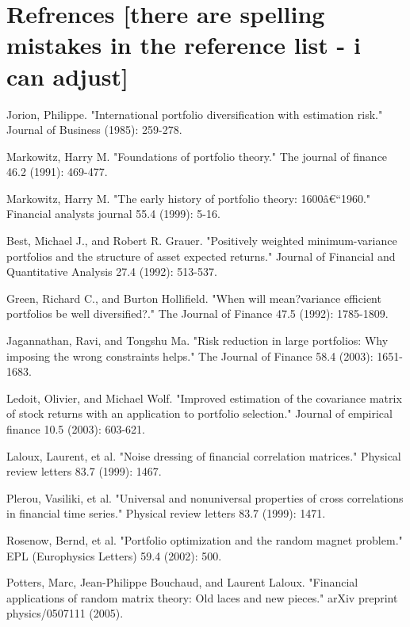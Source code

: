 \documentclass[ aip,jmp,reprint]{revtex4-2}
\begin{document}
\section{Refrences [there are spelling mistakes in the reference list - i
can adjust]}

\begin{thebibliography}{99}
 Jorion, Philippe. "International portfolio diversification
with estimation risk." Journal of Business (1985): 259-278.

 Markowitz, Harry M. "Foundations of portfolio theory." The
journal of finance 46.2 (1991): 469-477.

 Markowitz, Harry M. "The early history of portfolio theory:
1600\^{a}\euro ``1960." Financial analysts journal 55.4 (1999): 5-16.

 Best, Michael J., and Robert R. Grauer. "Positively weighted
minimum-variance portfolios and the structure of asset expected returns."
Journal of Financial and Quantitative Analysis 27.4 (1992): 513-537.

 Green, Richard C., and Burton Hollifield. "When will mean?variance efficient portfolios be well diversified?." The Journal of Finance 47.5 (1992): 1785-1809.

 Jagannathan, Ravi, and Tongshu Ma. "Risk reduction in
large portfolios: Why imposing the wrong constraints helps." The Journal of
Finance 58.4 (2003): 1651-1683.

 Ledoit, Olivier, and Michael Wolf. "Improved estimation of
the covariance matrix of stock returns with an application to portfolio
selection." Journal of empirical finance 10.5 (2003): 603-621.

 Laloux, Laurent, et al. "Noise dressing of financial
correlation matrices." Physical review letters 83.7 (1999): 1467.

 Plerou, Vasiliki, et al. "Universal and nonuniversal
properties of cross correlations in financial time series." Physical review
letters 83.7 (1999): 1471.

 Rosenow, Bernd, et al. "Portfolio optimization and the
random magnet problem." EPL (Europhysics Letters) 59.4 (2002): 500.

 Potters, Marc, Jean-Philippe Bouchaud, and Laurent Laloux.
"Financial applications of random matrix theory: Old laces and new pieces."
arXiv preprint physics/0507111 (2005).


\end{thebibliography}
\end{document}
